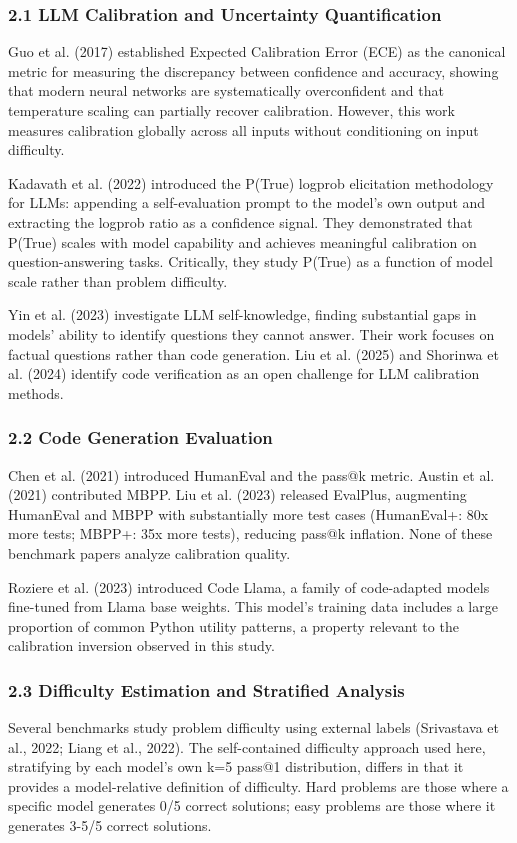 
\subsubsection{2.1 LLM Calibration and Uncertainty Quantification}

Guo et al. (2017) established Expected Calibration Error (ECE) as the canonical metric for measuring the discrepancy between confidence and accuracy, showing that modern neural networks are systematically overconfident and that temperature scaling can partially recover calibration. However, this work measures calibration globally across all inputs without conditioning on input difficulty.

Kadavath et al. (2022) introduced the P(True) logprob elicitation methodology for LLMs: appending a self-evaluation prompt to the model's own output and extracting the logprob ratio as a confidence signal. They demonstrated that P(True) scales with model capability and achieves meaningful calibration on question-answering tasks. Critically, they study P(True) as a function of model scale rather than problem difficulty.

Yin et al. (2023) investigate LLM self-knowledge, finding substantial gaps in models' ability to identify questions they cannot answer. Their work focuses on factual questions rather than code generation. Liu et al. (2025) and Shorinwa et al. (2024) identify code verification as an open challenge for LLM calibration methods.

\subsubsection{2.2 Code Generation Evaluation}

Chen et al. (2021) introduced HumanEval and the pass@k metric. Austin et al. (2021) contributed MBPP. Liu et al. (2023) released EvalPlus, augmenting HumanEval and MBPP with substantially more test cases (HumanEval+: 80x more tests; MBPP+: 35x more tests), reducing pass@k inflation. None of these benchmark papers analyze calibration quality.

Roziere et al. (2023) introduced Code Llama, a family of code-adapted models fine-tuned from Llama base weights. This model's training data includes a large proportion of common Python utility patterns, a property relevant to the calibration inversion observed in this study.

\subsubsection{2.3 Difficulty Estimation and Stratified Analysis}

Several benchmarks study problem difficulty using external labels (Srivastava et al., 2022; Liang et al., 2022). The self-contained difficulty approach used here, stratifying by each model's own k=5 pass@1 distribution, differs in that it provides a model-relative definition of difficulty. Hard problems are those where a specific model generates 0/5 correct solutions; easy problems are those where it generates 3-5/5 correct solutions.
